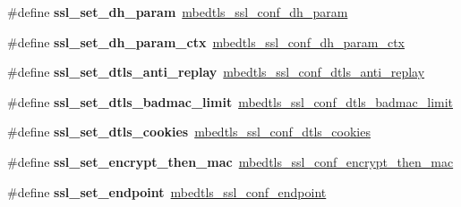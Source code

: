 \begin{DoxyCompactItemize}
\item 
\mbox{\label{compat-1_83_8h_ab0ff0b1b033dd6e7cd7d86070dc7348b}} 
\#define {\bfseries ssl\+\_\+set\+\_\+dh\+\_\+param}~\mbox{\hyperlink{ssl_8h_a62445aeddae0780ea2247c455a3d965d}{mbedtls\+\_\+ssl\+\_\+conf\+\_\+dh\+\_\+param}}
\item 
\mbox{\label{compat-1_83_8h_a04d60b1e077149ba8f88a1f0008a7030}} 
\#define {\bfseries ssl\+\_\+set\+\_\+dh\+\_\+param\+\_\+ctx}~\mbox{\hyperlink{ssl_8h_aec6d67681da3a0d5cb259137af176d56}{mbedtls\+\_\+ssl\+\_\+conf\+\_\+dh\+\_\+param\+\_\+ctx}}
\item 
\mbox{\label{compat-1_83_8h_ad28e786eb108a1a15326606ff2323b91}} 
\#define {\bfseries ssl\+\_\+set\+\_\+dtls\+\_\+anti\+\_\+replay}~\mbox{\hyperlink{ssl_8h_a46d919254eafef2ae642fb692c5e560a}{mbedtls\+\_\+ssl\+\_\+conf\+\_\+dtls\+\_\+anti\+\_\+replay}}
\item 
\mbox{\label{compat-1_83_8h_a0cba4fe6a1649b3345cf17403a9a94a9}} 
\#define {\bfseries ssl\+\_\+set\+\_\+dtls\+\_\+badmac\+\_\+limit}~\mbox{\hyperlink{ssl_8h_a9baa37a4b839319d00d8b43c8d266719}{mbedtls\+\_\+ssl\+\_\+conf\+\_\+dtls\+\_\+badmac\+\_\+limit}}
\item 
\mbox{\label{compat-1_83_8h_a014fd007a6e3bf07f7edd7311d5f21a0}} 
\#define {\bfseries ssl\+\_\+set\+\_\+dtls\+\_\+cookies}~\mbox{\hyperlink{ssl_8h_a5865631bc70b4511c25f558d5221fd65}{mbedtls\+\_\+ssl\+\_\+conf\+\_\+dtls\+\_\+cookies}}
\item 
\mbox{\label{compat-1_83_8h_a531e999209196c97ed6f272ddbf7b047}} 
\#define {\bfseries ssl\+\_\+set\+\_\+encrypt\+\_\+then\+\_\+mac}~\mbox{\hyperlink{ssl_8h_afa8a1d55630fec25f2247fc9958eaa53}{mbedtls\+\_\+ssl\+\_\+conf\+\_\+encrypt\+\_\+then\+\_\+mac}}
\item 
\mbox{\label{compat-1_83_8h_a63b471b477ae3af01462cb59cdfa4074}} 
\#define {\bfseries ssl\+\_\+set\+\_\+endpoint}~\mbox{\hyperlink{ssl_8h_a3a763e35d55c18e6792a3b756d825684}{mbedtls\+\_\+ssl\+\_\+conf\+\_\+endpoint}}
\item 
\mbox{\label{compat-1_83_8h_ad76d69aff9c31a4eb698d8c21c1c4848}} 

\end{DoxyCompactItemize}
